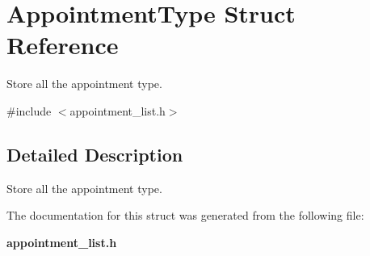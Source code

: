 \section{Appointment\+Type Struct Reference}
\label{struct_appointment_type}


Store all the appointment type.  




{\ttfamily \#include $<$appointment\+\_\+list.\+h$>$}



\subsection{Detailed Description}
Store all the appointment type. 

The documentation for this struct was generated from the following file\+:\begin{DoxyCompactItemize}
\item 
{\bf appointment\+\_\+list.\+h}\end{DoxyCompactItemize}
